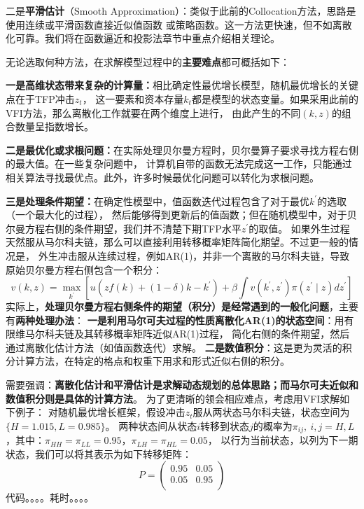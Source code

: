 二是\textbf{平滑估计}（Smooth Approximation）：类似于此前的Collocation方法，思路是使用连续或平滑函数直接近似值函数
或策略函数。这一方法更快速，但不如离散化可靠。我们将在函数逼近和投影法章节中重点介绍相关理论。

无论选取何种方法，在求解模型过程中的\textbf{主要难点}都可概括如下：

\textbf{一是高维状态带来复杂的计算量：}相比确定性最优增长模型，随机最优增长的关键点在于TFP冲击$z_t$，
这一要素和资本存量$k_t$都是模型的状态变量。如果采用此前的VFI方法，那么离散化工作就要在两个维度上进行，
由此产生的不同$(k,z)$的组合数量呈指数增长。

\textbf{二是最优化或求根问题：}在实际处理贝尔曼方程时，贝尔曼算子要求寻找方程右侧的最大值。在一些复杂问题中，
计算机自带的函数无法完成这一工作，只能通过相关算法寻找最优点。此外，许多时候最优化问题可以转化为求根问题。

\textbf{三是处理条件期望：}在确定性模型中，值函数迭代过程包含了对于最优$k^{\prime}$的选取（一个最大化的过程），
然后能够得到更新后的值函数；但在随机模型中，对于贝尔曼方程右侧的条件期望，我们并不清楚下期TFP水平$z^{\prime}$的取值。
如果外生过程天然服从马尔科夫链，那么可以直接利用转移概率矩阵简化期望。不过更一般的情况是，
外生冲击服从连续过程，例如AR(1)，并非一个离散的马尔科夫链，导致原始贝尔曼方程右侧包含一个积分：
\begin{equation*}
    v(k, z)=\max _{k^{\prime}}
        \left[u\left(zf(k)+(1-\delta)k-k^{\prime}\right)
        +\beta \int v\left(k^{\prime}, z^{\prime}\right) \pi\left(z^{\prime} \mid z\right) d z^{\prime}\right]
\end{equation*}
实际上，\textbf{处理贝尔曼方程右侧条件的期望（积分）是经常遇到的一般化问题}，主要有\textbf{两种处理办法}：
\textbf{一是利用马尔可夫过程的性质离散化AR(1)的状态空间}：用有限维马尔科夫链及其转移概率矩阵近似AR(1)过程，
简化右侧的条件期望，然后通过离散化估计方法（如值函数迭代）求解。
\textbf{二是数值积分}：这是更为灵活的积分计算方法，在特定的格点和权重下用求和形式近似右侧的积分。

需要强调：\textbf{离散化估计和平滑估计是求解动态规划的总体思路；而马尔可夫近似和数值积分则是具体的计算方法}。
为了更清晰的领会相应难点，考虑用VFI求解如下例子：
对随机最优增长框架，假设冲击$z_t$服从两状态马尔科夫链，状态空间为$\{H=1.015,L=0.985\}$。
两种状态间从状态$i$转移到状态$j$的概率为$\pi_{ij},~i,j=H,L$，其中：$\pi_{HH}=\pi_{LL}=0.95$，$\pi_{LH}=\pi_{HL}=0.05$，
以行为当前状态，以列为下一期状态，我们可以将其表示为如下转移矩阵：
\[
    P =
    \begin{pmatrix}
        0.95 & 0.05 \\
        0.05 & 0.95 \\
    \end{pmatrix}
\]
代码。。。。耗时。。。。

